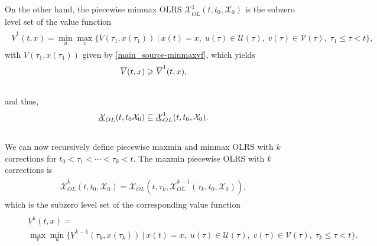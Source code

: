 \documentclass[letterpaper,10pt,english]{sphinxmanual}
\begin{document}
On the other hand, the piecewise minmax OLRS
$\underline{{\mathcal X}}_{OL}^1(t, t_0, {\mathcal X}_0)$ is the
subzero level set of the value function
\label{main_source:equation-minmaxvf1}\begin{gather}
\begin{split}\overline{V}^1(t, x) =
\min_u\max_v\{\overline{V}(\tau_1, x(\tau_1)) ~|~ x(t)=x, \;
u(\tau)\in{\mathcal U}(\tau), \; v(\tau)\in{\mathcal V}(\tau), \; \tau_1\leqslant\tau<t\},\end{split}\label{main_source-minmaxvf1}
\end{gather}
with $V(\tau_1, x(\tau_1))$ given by \eqref{main_source-minmaxvf}, which yields
\begin{gather}
\begin{split}\overline{V}(t, x) \geqslant\overline{V}^1(t, x),\end{split}\notag\\\begin{split}\end{split}\notag
\end{gather}
and thus,
\begin{gather}
\begin{split}\underline{{\mathcal X}}_{OL}(t, t_0 {\mathcal X}_0) \subseteq \underline{{\mathcal X}}_{OL}^1(t, t_0, {\mathcal X}_0) .\end{split}\notag\\\begin{split}\end{split}\notag
\end{gather}
We can now recursively define piecewise maxmin and minmax OLRS with
$k$ corrections for $t_0<\tau_1<\cdots<\tau_k<t$. The maxmin
piecewise OLRS with $k$ corrections is
\label{main_source:equation-maxmink}\begin{gather}
\begin{split}\overline{{\mathcal X}}_{OL}^k(t, t_0, {\mathcal X}_0) =
\overline{{\mathcal X}}_{OL}(t, \tau_k, \overline{{\mathcal X}}_{OL}^{k-1}(\tau_k, t_0, {\mathcal X}_0)),\end{split}\label{main_source-maxmink}
\end{gather}
which is the subzero level set of the corresponding value function
\label{main_source:equation-maxminvfk}\begin{gather}
\begin{split}\begin{aligned}
&&\underline{V}^k(t, x) = \nonumber \\
&&\max_v\min_u\{\underline{V}^{k-1}(\tau_k, x(\tau_k)) ~|~ x(t)=x, \;
u(\tau)\in{\mathcal U}(\tau), \; v(\tau)\in{\mathcal V}(\tau), \; \tau_k\leqslant\tau<t\}.
\end{aligned}\end{split}\label{main_source-maxminvfk}
\end{gather}
\end{document}

